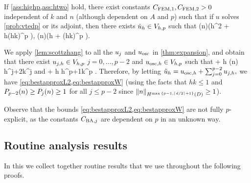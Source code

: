 
\label{lem:bestapprox}
If \cref{ass:highp,ass:htwo} hold, there exist constants $C_{\mathrm{FEM},1}, C_{\mathrm{FEM},2} > 0$ independent of $k$ and $n$ (although dependent on $A$ and $p$) such that if $u$ solves \cref{prob:vtedp} or its adjoint, then there exists $\hat{u}_{h} \in V_{h,p}$ such that
\beq\label{eq:bestapproxL2}
 \leq {}\mleft(n\mright)\mleft(\CFEMo  h^2 + \CFEMt \CAnk h\mleft(hk\mright)^p \mright)\Cfg,
\eeq
\beq\label{eq:bestapproxW}
 \mleft(n\mright)\mleft(\CFEMo  h + \CFEMt \CAnk \mleft(hk\mright)^p \mright)\Cfg.
\eeq
\ele


We apply \cref{lem:scottzhang} to all the $u_{j}$ and $u_{\mathrm{osc}}$ in \cref{thm:expansion}, and obtain that there exist $u_{j,h} \in V_{h,p}$ $j=0,\ldots,p-2$ and $u_{\mathrm{osc},h} \in V_{h,p}$ such that 
\beqs
\NLtD{\usj - \ujh} + h\NHoD{\usj - \ujh} \leq {}  \Pj\mleft(n\mright) h^{j+2}k^j \Cfg
\eeqs
and
\beqs
\NLtD{\uosc - \uosch} + h\NHoD{\uosc - \uosch} \leq {} \Cosc\CAnk h^{p+1}k^p \Cfg.
\eeqs
Therefore, by letting $\hat{u}_{h} = u_{\mathrm{osc},h} + \sum_{j=0}^{p-2} u_{j,h},$ we have \cref{eq:bestapproxL2,eq:bestapproxW} (using the facts that $hk \leq 1$ and $P_{p-2}(n) \geq P_{j}(n) \geq 1$ for all $j \leq p-2$ since $\SNtemp{n} \geq 1$).
\epf

Observe that the bounds \cref{eq:bestapproxL2,eq:bestapproxW} are not fully $p$-explicit, as the constants $C_{\mathrm{BA},j}$ are dependent on $p$ in an unknown way.

\subsection{Routine analysis results}\label{sec:anbackground}
In this  we collect together routine results that we use throughout the following proofs.

